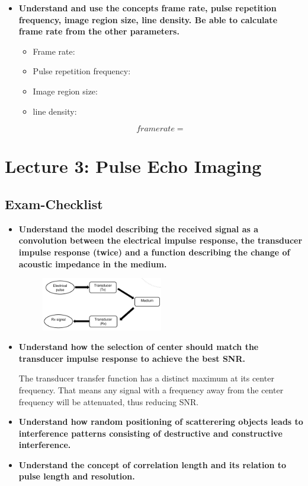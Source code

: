 \documentclass[10pt,a4paper,noendnumber=true]{scrartcl}
\begin{document}
\begin{itemize}
\item \textbf{Understand and use the concepts frame rate, pulse repetition frequency, image region size, line density. Be able to calculate frame rate from the other parameters.}

\begin{itemize}
\item Frame rate:
\item Pulse repetition frequency:
\item Image region size:
\item line density:
\end{itemize}

\begin{equation}
framerate=
\end{equation}

\end{itemize}

\newpage
\section{Lecture 3: Pulse Echo Imaging}

\subsection{Exam-Checklist}
\begin{itemize}
\item \textbf{Understand the model describing the received signal as a convolution between the electrical impulse response, the transducer impulse response (twice) and a function describing the change of acoustic impedance in the medium.}

\begin{figure}[H]
\centering
\includegraphics[width=0.5\textwidth]{img/pulseecho1.png}
\end{figure}

\item \textbf{Understand how the selection of center should match the transducer impulse response to achieve the best SNR.}

The transducer transfer function has a distinct maximum at its center frequency. That means any signal with a frequency away from the center frequency will be attenuated, thus reducing SNR.

\item \textbf{Understand how random positioning of scatterering objects leads to interference patterns consisting of destructive and constructive interference.}



\item \textbf{Understand the concept of correlation length and its relation to pulse length and resolution.}
\end{itemize}
\end{document}
